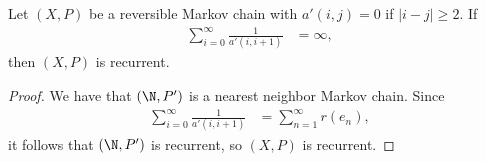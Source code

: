 \documentclass[10pt]{mypackage}
\begin{document}
\begin{corollary}
  Let $\left( X,P \right)$ be a reversible Markov chain with $a'\left( i,j \right) = 0$ if $\left\vert i-j \right\vert \geq 2$. If
  \begin{align*}
    \sum_{i=0}^{\infty} \frac{1}{a'\left( i,i+1 \right)} &= \infty,
  \end{align*}
  then $\left( X,P \right)$ is recurrent.
\end{corollary}
\begin{proof}
  We have that $\left( \N,P' \right)$ is a nearest neighbor Markov chain. Since
  \begin{align*}
    \sum_{i=0}^{\infty} \frac{1}{a'\left( i,i+1 \right)} &= \sum_{n=1}^{\infty}r\left( e_n \right),
  \end{align*}
  it follows that $\left( \N,P' \right)$ is recurrent, so $\left( X,P \right)$ is recurrent.
\end{proof}
\end{document}
